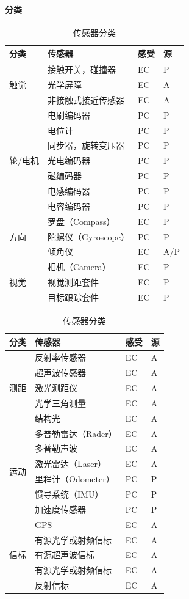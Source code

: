 \documentclass[
12pt, %
a4paper, 
oneside, %
]{scrartcl}
\begin{document}
\paragraph{分类}
\begin{table}[H]
\begin{tabular}{|p{1.5cm}|p{4.2cm}|p{0.9cm}|p{0.8cm}|}
\hline
分类 & 传感器 & 感受 & 源 \\
\hline
\multirow{3}{*}{触觉} & 接触开关，碰撞器 & EC & P \\
 & 光学屏障 & EC & A \\
 & 非接触式接近传感器 & EC & A \\
\hline
\multirow{7}{*}{轮/电机} & 电刷编码器 & PC & P \\
 & 电位计 & PC & P \\
 & 同步器，旋转变压器 & PC & P \\
 & 光电编码器 & PC & P \\
 & 磁编码器 & PC & P \\
 & 电感编码器 & PC & P \\
 & 电容编码器 & PC & P \\
\hline
\multirow{3}{*}{方向} & 罗盘（Compass） & EC & P \\
 & 陀螺仪（Gyroscope） & PC & P \\
 & 倾角仪 & EC & A/P \\
\hline
\multirow{3}{*}{视觉} & 相机（Camera） & EC & P \\
 & 视觉测距套件 & EC & P \\
 & 目标跟踪套件 & EC & P \\
\hline
\end{tabular}
\begin{tabular}{|p{1.5cm}|p{4.2cm}|p{0.9cm}|p{0.8cm}|}
\hline
分类 & 传感器 & 感受 & 源 \\
\hline
\multirow{5}{*}{测距} & 反射率传感器 & EC & A \\
 & 超声波传感器 & EC & A \\
 & 激光测距仪 & EC & A \\
 & 光学三角测量 & EC & A \\
 & 结构光 & EC & A \\
\hline
\multirow{6}{*}{运动} & 多普勒雷达（Rader） & EC & A \\
 & 多普勒声波 & EC & A \\
 & 激光雷达（Laser） & EC & A \\
 & 里程计（Odometer） & PC & P \\
 & 惯导系统（IMU） & PC & P \\
 & 加速度传感器 & PC & P \\
\hline
\multirow{5}{*}{信标} & GPS & EC & A \\
 & 有源光学或射频信标 & EC & A \\
 & 有源超声波信标 & EC & A \\
 & 有源光学或射频信标 & EC & A \\
 & 反射信标 & EC & A \\
\hline
\end{tabular}
\caption{传感器分类}
\end{table}
\end{document}
